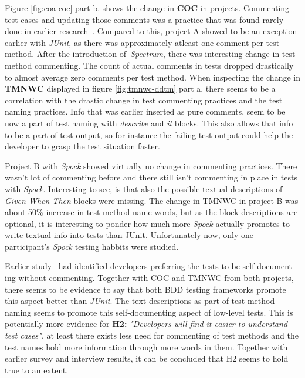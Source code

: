 Figure \ref{fig:coa-coc} part b. shows the change in \textbf{COC} in projects. Commenting test cases and updating those
comments was a practice that was found rarely done in earlier research~\cite{li2016automatically}. Compared to this,
project A showed to be an exception earlier with \textit{JUnit}, as there was approximately atleast one comment per test method.
After the introduction of \textit{Spectrum}, there was interesting change in test method commenting. The count of actual comments
in tests dropped drastically to almost average zero comments per test method. When inspecting the change in \textbf{TMNWC}
displayed in figure \ref{fig:tmnwc-ddtm} part a, there seems to be a correlation with the drastic change in test commenting
practices and the test naming practices. Info that was earlier inserted as pure comments, seem to be now a part of test
naming with \textit{describe} and \textit{it} blocks. This also allows that info to be a part of test output, so for instance
the failing test output could help the developer to grasp the test situation faster.

Project B with \textit{Spock} showed virtually no change in commenting practices. There wasn't lot of commenting before and there still isn't
commenting in place in tests with \textit{Spock}. Interesting to see, is that also the possible textual descriptions of \textit{Given-When-Then} blocks
were missing. The change in TMNWC in project B was about 50\% increase in test method name words, but as the block descriptions
are optional, it is interesting to ponder how much more \textit{Spock} actually promotes to write textual info into tests than
JUnit. Unfortunately now, only one participant's \textit{Spock} testing habbits were studied.

Earlier study~\cite{li2016automatically} had identified developers preferring the tests to be self-document- ing without commenting.
Together with COC and TMNWC from both projects, there seems to be evidence to say that both BDD testing frameworks
promote this aspect better than \textit{JUnit}. The text descriptions as part of test method naming seems to promote this self-documenting
aspect of low-level tests. This is potentially more evidence for \textbf{H2:} \textit{"Developers will find it easier to understand test cases"}, at least
there exists less need for commenting of test methods and the test names hold more information through more words in them.
Together with earlier survey and interview results, it can be concluded that H2 seems to hold true to an extent.

